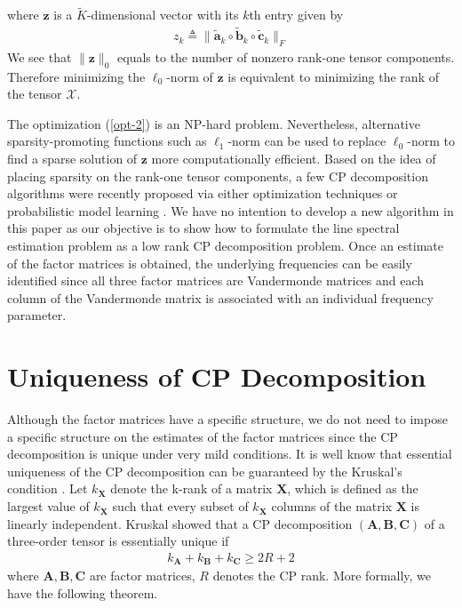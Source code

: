 \documentclass[10pt,journal,epsfig]{IEEEtran}
\begin{document}
where $\boldsymbol{z}$ is a $\tilde{K}$-dimensional vector with
its $k$th entry given by
\begin{align}
z_{k}\triangleq\|\boldsymbol{\tilde{a}}_k\circ
\boldsymbol{\tilde{b}}_k\circ\boldsymbol{\tilde{c}}_k\|_{F}
\end{align}
We see that $\|\boldsymbol{z}\|_{0}$ equals to the number of
nonzero rank-one tensor components. Therefore minimizing the
$\ell_0$-norm of $\boldsymbol{z}$ is equivalent to minimizing the
rank of the tensor $\boldsymbol{\mathcal{X}}$.

The optimization (\ref{opt-2}) is an NP-hard problem.
Nevertheless, alternative sparsity-promoting functions such as
$\ell_1$-norm can be used to replace $\ell_0$-norm to find a
sparse solution of $\boldsymbol{z}$ more computationally
efficient. Based on the idea of placing sparsity on the rank-one
tensor components, a few CP decomposition algorithms were recently
proposed via either optimization techniques
\cite{MateosGiannakis13} or probabilistic model learning
\cite{RaiWang14,ZhaoZhang15}. We have no intention to develop a
new algorithm in this paper as our objective is to show how to
formulate the line spectral estimation problem as a low rank CP
decomposition problem. Once an estimate of the factor matrices is
obtained, the underlying frequencies can be easily identified
since all three factor matrices are Vandermonde matrices and each
column of the Vandermonde matrix is associated with an individual
frequency parameter.



\section{Uniqueness of CP Decomposition}
Although the factor matrices have a specific structure, we do not
need to impose a specific structure on the estimates of the factor
matrices since the CP decomposition is unique under very mild
conditions. It is well know that essential uniqueness of the CP
decomposition can be guaranteed by the Kruskal's condition
\cite{StegemanSidiropoulos07}. Let $k_{\boldsymbol{X}}$ denote the
k-rank of a matrix $\boldsymbol{X}$, which is defined as the
largest value of $k_{\boldsymbol{X}}$ such that every subset of
$k_{\boldsymbol{X}}$ columns of the matrix $\boldsymbol{X}$ is
linearly independent. Kruskal showed that a CP decomposition
$(\boldsymbol{A},\boldsymbol{B},\boldsymbol{C})$ of a three-order
tensor is essentially unique if
\begin{align}
k_{\boldsymbol{A}}+k_{\boldsymbol{B}}+k_{\boldsymbol{C}}\geq 2R+2
\label{Kruskals-condition}
\end{align}
where $\boldsymbol{A},\boldsymbol{B},\boldsymbol{C}$ are factor
matrices, $R$ denotes the CP rank. More formally, we have the
following theorem.
\end{document}
